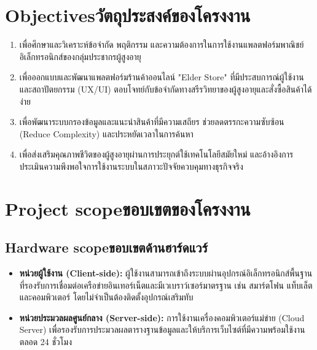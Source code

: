\section{\ifenglish Objectives\else วัตถุประสงค์ของโครงงาน\fi}
\begin{enumerate}
    \item เพื่อศึกษาและวิเคราะห์ข้อจำกัด พฤติกรรม และความต้องการในการใช้งานแพลตฟอร์มพาณิชย์อิเล็กทรอนิกส์ของกลุ่มประชากรผู้สูงอายุ
    \item เพื่อออกแบบและพัฒนาแพลตฟอร์มร้านค้าออนไลน์ "Elder Store" ที่มีประสบการณ์ผู้ใช้งานและสถาปัตยกรรม (UX/UI) ตอบโจทย์กับข้อจำกัดทางสรีรวิทยาของผู้สูงอายุและสั่งซื้อสินค้าได้ง่าย
    \item เพื่อพัฒนาระบบกรองข้อมูลและแนะนำสินค้าที่มีความเสถียร ช่วยลดตรรกะความซับซ้อน (Reduce Complexity) และประหยัดเวลาในการค้นหา
    \item เพื่อส่งเสริมคุณภาพชีวิตของผู้สูงอายุผ่านการประยุกต์ใช้เทคโนโลยีสมัยใหม่ และอ้างอิงการประเมินความพึงพอใจการใช้งานระบบในสภาวะปัจจัยควบคุมทางธุรกิจจริง
\end{enumerate}

\section{\ifenglish Project scope\else ขอบเขตของโครงงาน\fi}

\subsection{\ifenglish Hardware scope\else ขอบเขตด้านฮาร์ดแวร์\fi}
\begin{itemize}
    \item \textbf{หน่วยผู้ใช้งาน (Client-side):} ผู้ใช้งานสามารถเข้าถึงระบบผ่านอุปกรณ์อิเล็กทรอนิกส์พื้นฐานที่รองรับการเชื่อมต่อเครือข่ายอินเทอร์เน็ตและมีเวเบราว์เซอร์มาตรฐาน เช่น สมาร์ตโฟน แท็บเล็ต และคอมพิวเตอร์ โดยไม่จำเป็นต้องติดตั้งอุปกรณ์เสริมทับ
    \item \textbf{หน่วยประมวลผลศูนย์กลาง (Server-side):} การใช้งานเครื่องคอมพิวเตอร์แม่ข่าย (Cloud Server) เพื่อรองรับการประมวลผลตารางฐานข้อมูลและให้บริการเว็บไซต์ที่มีความพร้อมใช้งานตลอด 24 ชั่วโมง
\end{itemize}


